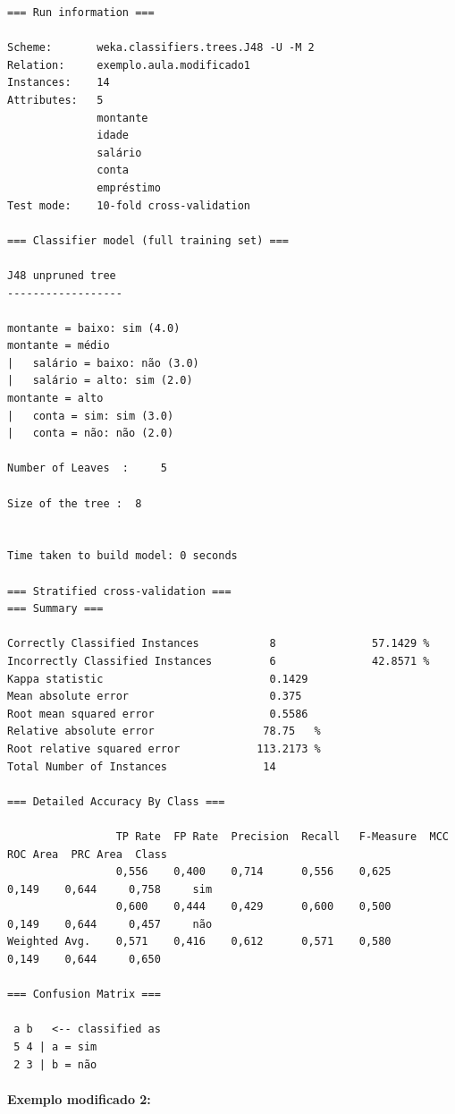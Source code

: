 \documentclass[
    article,            %
    11pt,               %
    oneside,            %
    a4paper,            %
    english,            %
    brazil,             %
    sumario=tradicional,
    ]{abntex2}
\begin{document}
\begin{Verbatim}[frame=single, fontsize=\tiny]
=== Run information ===

Scheme:       weka.classifiers.trees.J48 -U -M 2
Relation:     exemplo.aula.modificado1
Instances:    14
Attributes:   5
              montante
              idade
              salário
              conta
              empréstimo
Test mode:    10-fold cross-validation

=== Classifier model (full training set) ===

J48 unpruned tree
------------------

montante = baixo: sim (4.0)
montante = médio
|   salário = baixo: não (3.0)
|   salário = alto: sim (2.0)
montante = alto
|   conta = sim: sim (3.0)
|   conta = não: não (2.0)

Number of Leaves  :     5

Size of the tree :  8


Time taken to build model: 0 seconds

=== Stratified cross-validation ===
=== Summary ===

Correctly Classified Instances           8               57.1429 %
Incorrectly Classified Instances         6               42.8571 %
Kappa statistic                          0.1429
Mean absolute error                      0.375 
Root mean squared error                  0.5586
Relative absolute error                 78.75   %
Root relative squared error            113.2173 %
Total Number of Instances               14     

=== Detailed Accuracy By Class ===

                 TP Rate  FP Rate  Precision  Recall   F-Measure  MCC      ROC Area  PRC Area  Class
                 0,556    0,400    0,714      0,556    0,625      0,149    0,644     0,758     sim
                 0,600    0,444    0,429      0,600    0,500      0,149    0,644     0,457     não
Weighted Avg.    0,571    0,416    0,612      0,571    0,580      0,149    0,644     0,650     

=== Confusion Matrix ===

 a b   <-- classified as
 5 4 | a = sim
 2 3 | b = não
\end{Verbatim}

\paragraph*{\textbf{Exemplo modificado 2:}}
\end{document}
